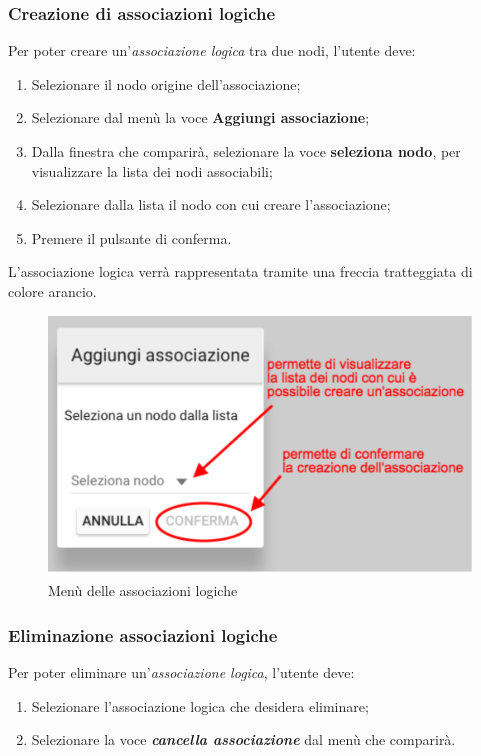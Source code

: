 \subsubsection{Creazione di associazioni logiche}
Per poter creare un'\textit{associazione logica} tra due nodi, l'utente deve:
\begin{enumerate}
\item Selezionare il nodo origine dell'associazione;
\item Selezionare dal menù la voce \textbf{Aggiungi associazione};
\item Dalla finestra che comparirà, selezionare la voce \textbf{seleziona nodo}, per visualizzare la lista dei nodi associabili;
\item Selezionare dalla lista il nodo con cui creare l'associazione;
\item Premere il pulsante di conferma.
\end{enumerate}
L'associazione logica verrà rappresentata tramite una freccia tratteggiata di colore arancio.
\begin{figure}[H]
\centering
\includegraphics[scale=0.5]{immagini/associazioneMenu.pdf}
\caption{Menù delle associazioni logiche}
\end{figure}
\subsubsection{Eliminazione associazioni logiche}
Per poter eliminare un'\textit{associazione logica}, l'utente deve:
\begin{enumerate}
\item Selezionare l'associazione logica che desidera eliminare;
\item Selezionare la voce \textbf{\textit{cancella associazione}} dal menù che comparirà.
\end{enumerate}
